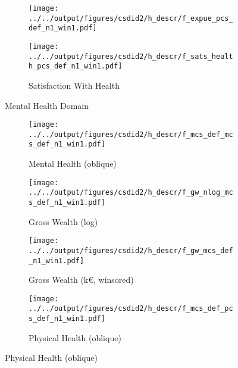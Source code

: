 \begin{figure}
\begin{subfigure}{0.32\textwidth}
        \texttt{[image: ../../output/figures/csdid2/h\_descr/f\_expue\_pcs\_def\_n1\_win1.pdf]}
        \label{sfig:fexpuepcsdef}
    \end{subfigure}
    \begin{subfigure}{0.32\textwidth}
        \caption{Satisfaction With Health}
        \texttt{[image: ../../output/figures/csdid2/h\_descr/f\_sats\_health\_pcs\_def\_n1\_win1.pdf]}
        \label{sfig:fsatshealthpcsdef}
    \end{subfigure}
    \centering \setcounter{subfigure}{0}%
    \renewcommand{\thesubfigure}{M\alph{subfigure}}
    Mental Health Domain
    \\ %
    \begin{subfigure}{0.32\textwidth}
        \caption{Mental Health (oblique)}
        \texttt{[image: ../../output/figures/csdid2/h\_descr/f\_mcs\_def\_mcs\_def\_n1\_win1.pdf]}
        \label{sfig:fmcsdefmcsdef}
    \end{subfigure}
    \begin{subfigure}{0.32\textwidth}
        \caption{Gross Wealth (log)}
        \texttt{[image: ../../output/figures/csdid2/h\_descr/f\_gw\_nlog\_mcs\_def\_n1\_win1.pdf]}
        \label{sfig:fgwnlogmcsdef}
    \end{subfigure}
    \begin{subfigure}{0.32\textwidth}
        \caption{Gross Wealth (k€, winsored)}
        \texttt{[image: ../../output/figures/csdid2/h\_descr/f\_gw\_mcs\_def\_n1\_win1.pdf]}
        \label{sfig:fgwmcsdef}
    \end{subfigure}
    \begin{subfigure}{0.32\textwidth}
        \caption{Physical Health (oblique)}
        \texttt{[image: ../../output/figures/csdid2/h\_descr/f\_mcs\_def\_pcs\_def\_n1\_win1.pdf]}

\end{subfigure}
\end{figure}
